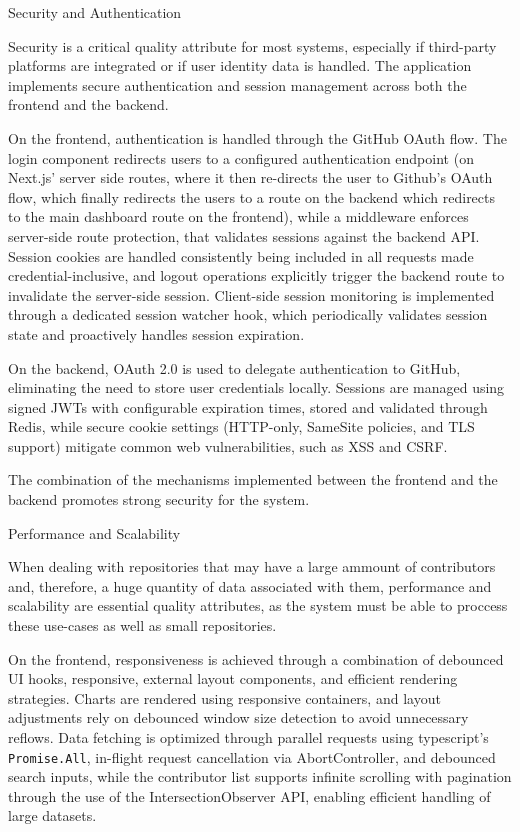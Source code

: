 \documentclass[12pt,reqno, twoside]{amsbook}
\makeatletter
\def\subsubsection{\@startsection{subsubsection}{3}%
      \z@{.5\linespacing\@plus.7\linespacing}{.25\linespacing}%
      {\normalfont\bfseries\flushleft}}
\theoremstyle{plain}
\numberwithin{equation}{chapter}
\numberwithin{section}{chapter}
\makeatother
\begin{document}
\subsubsection{Security and Authentication}

Security is a critical quality attribute for most systems, especially if third-party platforms are integrated or if user identity 
data is handled. The application implements secure authentication and session management across both the frontend and the backend.

On the frontend, authentication is handled through the GitHub OAuth flow. The login component redirects users to a configured 
authentication endpoint (on Next.js' server side routes, where it then re-directs the user to Github's OAuth flow, which finally 
redirects the users to a route on the backend which redirects to the main dashboard route on the frontend), while a middleware 
enforces server-side route protection, that validates sessions against the backend API. Session cookies are handled consistently 
being included in all requests made credential-inclusive, and logout operations explicitly trigger the backend route to invalidate 
the server-side session. Client-side session monitoring is implemented through a dedicated session watcher hook, which periodically 
validates session state and proactively handles session expiration.

On the backend, OAuth 2.0 is used to delegate authentication to GitHub, eliminating the need to store user credentials locally. 
Sessions are managed using signed JWTs with configurable expiration times, stored and validated through Redis, while secure cookie 
settings (HTTP-only, SameSite policies, and TLS support) mitigate common web vulnerabilities, such as XSS and CSRF.

The combination of the mechanisms implemented between the frontend and the backend promotes strong security for the system.

\subsubsection{Performance and Scalability}

When dealing with repositories that may have a large ammount of contributors and, therefore, a huge quantity of data associated with 
them, performance and scalability are essential quality attributes, as the system must be able to proccess these use-cases as well as 
small repositories.

On the frontend, responsiveness is achieved through a combination of debounced UI hooks, responsive, external layout components, 
and efficient rendering strategies. Charts are rendered using responsive containers, and layout adjustments rely on debounced window 
size detection to avoid unnecessary reflows. Data fetching is optimized through parallel requests using typescript's \texttt{Promise.All}, 
in-flight request cancellation via AbortController, and debounced search inputs, while the contributor list supports infinite 
scrolling with pagination through the use of the IntersectionObserver API, enabling efficient handling of large datasets.
\end{document}
